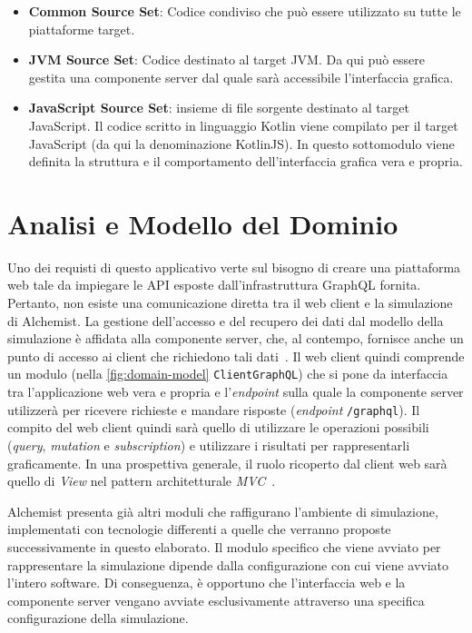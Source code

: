 \begin{itemize}
	\item \textbf{Common Source Set}: Codice condiviso che può essere utilizzato su tutte le piattaforme target. 
	\item \textbf{JVM Source Set}: Codice destinato al target \ac{JVM}. Da qui può essere gestita una componente server dal quale sarà accessibile l'interfaccia grafica.
	\item \textbf{JavaScript Source Set}: insieme di file sorgente destinato al target JavaScript. Il codice scritto in linguaggio Kotlin viene compilato per il target JavaScript (da qui la denominazione KotlinJS). In questo sottomodulo viene definita la struttura e il comportamento dell'interfaccia grafica vera e propria.
\end{itemize}

\section{Analisi e Modello del Dominio}
Uno dei requisti di questo applicativo verte sul bisogno di creare una piattaforma web tale da impiegare le \ac{API} esposte dall'infrastruttura GraphQL fornita. Pertanto, non esiste una comunicazione diretta tra il web client e la simulazione di Alchemist. La gestione dell'accesso e del recupero dei dati dal modello della simulazione è affidata alla componente server, che, al contempo, fornisce anche un punto di accesso ai client che richiedono tali dati~\cite{amslaurea30280}.
Il web client quindi comprende un modulo (nella \cref{fig:domain-model} \texttt{ClientGraphQL}) che si pone da interfaccia tra l'applicazione web vera e propria e l'\textit{endpoint} sulla quale la componente server utilizzerà per ricevere richieste e mandare risposte (\textit{endpoint} \texttt{/graphql}). 
Il compito del web client quindi sarà quello di utilizzare le operazioni possibili (\textit{query}, \textit{mutation} e \textit{subscription}) e utilizzare i risultati per rappresentarli graficamente. In una prospettiva generale, il ruolo ricoperto dal client web sarà quello di \textit{View} nel pattern architetturale \textit{ \ac{MVC}}~\cite{Gamma1994}.

Alchemist presenta già altri moduli che raffigurano l'ambiente di simulazione, implementati con tecnologie differenti a quelle che verranno proposte successivamente in questo elaborato. Il modulo specifico che viene avviato per rappresentare la simulazione dipende dalla configurazione con cui viene avviato l'intero software. Di conseguenza, è opportuno che l'interfaccia web e la componente server vengano avviate esclusivamente attraverso una specifica configurazione della simulazione.


